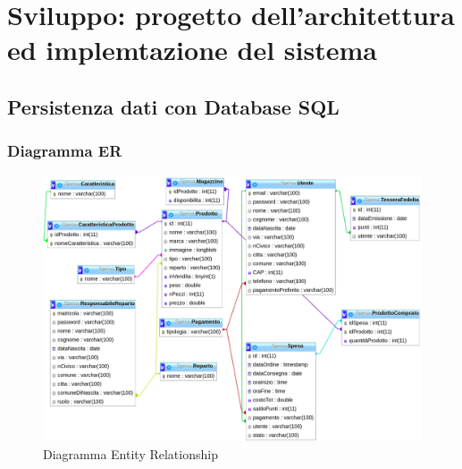 \documentclass{article}
\begin{document}
\section{Sviluppo: progetto dell'architettura ed implemtazione del sistema}
\subsection{Persistenza dati con Database SQL}
\subsubsection{Diagramma ER}

\begin{figure}[h!]
	\centering
	\includegraphics[width=\textwidth]{DiagrammaER.png}
	\caption{Diagramma Entity Relationship}
	\label{fig:DiagrammaER}
\end{figure}
\end{document}
